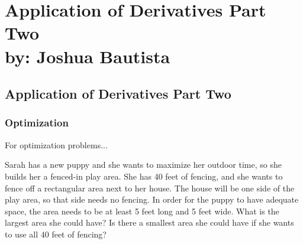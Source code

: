 \documentclass[12pt,fleqn]{book} %
\begin{document}
\part{Application of Derivatives Part Two\\ by: Joshua Bautista}


\pagebreak

\chapter{Application of Derivatives Part Two}

\section{Optimization}

For optimization problems...

\vspace*{5mm}


\noindent \small Sarah has a new puppy and she wants to maximize her outdoor time, so she builds her a fenced-in play area. She has 40 feet of fencing,
and she wants to fence off a rectangular area next to her house. The house will be one side of the play area, so that side needs no fencing. In order
for the puppy to have adequate space, the area needs to be at least 5  feet long and 5 feet wide. What is the largest area she could have? Is there a
smallest area she could have if she wants to use all 40 feet of fencing?

\vspace*{2.5mm}
\end{document}
